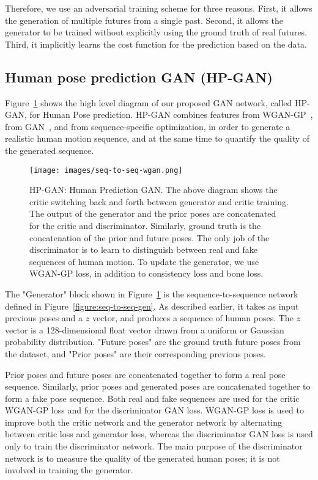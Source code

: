 \documentclass[10pt,twocolumn,letterpaper]{article}
\begin{document}
Therefore, we use an adversarial training scheme for three reasons. First, it allows the generation of multiple futures from a single past. Second, it allows the generator to be trained without explicitly using the ground truth of real futures. Third, it implicitly learns the cost function for the prediction based on the data. 

\subsection{Human pose prediction GAN (HP-GAN)}
Figure~\ref{figure:seq-to-seq-wgan} shows the high level diagram of our proposed GAN network, called HP-GAN, for Human Pose prediction. HP-GAN combines features from WGAN-GP~\cite{corr2017:Ishaan}, from GAN~\cite{nips2014:Goodfellow}, and from sequence-specific optimization, in order to generate a realistic human motion sequence, and at the same time to quantify the quality of the generated sequence. 

\begin{figure}[ht]
\centering
\texttt{[image: images/seq-to-seq-wgan.png]}
\caption{HP-GAN: Human Prediction GAN. The above diagram shows the critic switching back and forth between generator and critic training. The output of the generator and the prior poses are concatenated for the critic and discriminator.  Similarly, ground truth is the concatenation of the prior and future poses. The only job of the discriminator is to learn to distinguish between real and fake sequences of human motion. To update the generator, we use WGAN-GP loss, in addition to consistency loss and bone loss.}
\label{figure:seq-to-seq-wgan}
\end{figure}

The "Generator" block shown in Figure~\ref{figure:seq-to-seq-wgan} is the sequence-to-sequence network defined in Figure~\ref{figure:seq-to-seq-gen}. As described earlier, it takes as input previous poses and a $z$ vector, and produces a sequence of human poses. The $z$ vector is a 128-dimensional float vector drawn from a uniform or Gaussian probability distribution. "Future poses" are the ground truth future poses from the dataset, and "Prior poses" are their corresponding previous poses.

Prior poses and future poses are concatenated together to form a real pose sequence. Similarly, prior poses and generated poses are concatenated together to form a fake pose sequence. Both real and fake sequences are used for the critic WGAN-GP loss and for the discriminator GAN loss. WGAN-GP loss is used to improve both the critic network and the generator network by alternating between critic loss and generator loss, whereas the discriminator GAN loss is used only to train the discriminator network. The main purpose of the discriminator network is to measure the quality of the generated human poses; it is not involved in training the generator.
\end{document}
